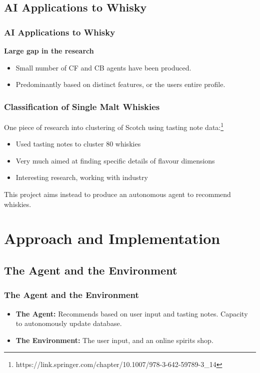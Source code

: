 \documentclass{beamer}
\begin{document}
\subsection{AI Applications to Whisky}
\begin{frame}
    \frametitle{AI Applications to Whisky}
    \textbf{Large gap in the research}
    \begin{itemize}
        \item Small number of CF and CB agents have been produced.
        \item Predominantly based on distinct features, or the users
        entire profile.
    \end{itemize}
\end{frame}

\begin{frame}
    \frametitle{Classification of Single Malt Whiskies}
    One piece of research into clustering of Scotch using tasting note data:\footnote{https://link.springer.com/chapter/10.1007/978-3-642-59789-3\_14}
    \begin{itemize}
        \item Used tasting notes to cluster 80 whiskies
        \item Very much aimed at finding specific details of flavour dimensions
        \item Interesting research, working with industry
    \end{itemize}
    This project aims instead to produce an autonomous agent to recommend whiskies.
\end{frame}

\section{Approach and Implementation} 

\subsection{The Agent and the Environment}
\begin{frame}
    \frametitle{The Agent and the Environment}
    \begin{itemize}
        \item \textbf{The Agent:} Recommends based on user input and 
        tasting notes. Capacity to autonomously update database.
        \item \textbf{The Environment:} The user input, and an online spirits
        shop.
    \end{itemize}
\end{frame}
\end{document}
